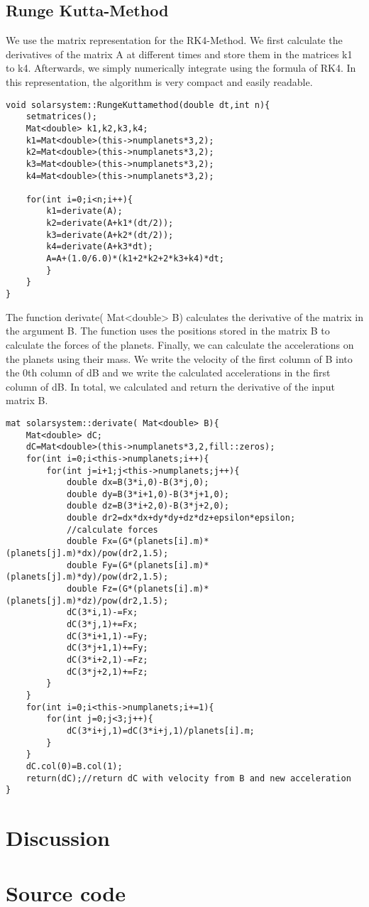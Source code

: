 \documentclass[10pt,a4paper]{article}
\begin{document}
\subsection{Runge Kutta-Method}
We use the matrix representation for the RK4-Method. We first calculate the derivatives of the matrix A at different times and store them in the matrices k1 to k4. Afterwards, we simply numerically integrate using the formula of RK4. In this representation, the algorithm is very compact and easily readable. 
\begin{lstlisting}
void solarsystem::RungeKuttamethod(double dt,int n){
    setmatrices();
    Mat<double> k1,k2,k3,k4;
    k1=Mat<double>(this->numplanets*3,2);
    k2=Mat<double>(this->numplanets*3,2);
    k3=Mat<double>(this->numplanets*3,2);
    k4=Mat<double>(this->numplanets*3,2);

    for(int i=0;i<n;i++){
        k1=derivate(A);
        k2=derivate(A+k1*(dt/2));
        k3=derivate(A+k2*(dt/2));
        k4=derivate(A+k3*dt);
        A=A+(1.0/6.0)*(k1+2*k2+2*k3+k4)*dt;
        }
    }
}
\end{lstlisting}
The function derivate( Mat<double> B) calculates the derivative of the matrix in the argument B. The function uses the positions stored in the matrix B to calculate the forces of the planets. Finally, we can calculate the accelerations on the planets using their mass. We write the velocity of the first column of B into the 0th column of dB and we write the calculated accelerations in the first column of dB. 
In total, we calculated and return the derivative of the input matrix B.
\begin{lstlisting}
mat solarsystem::derivate( Mat<double> B){
    Mat<double> dC;
    dC=Mat<double>(this->numplanets*3,2,fill::zeros);
    for(int i=0;i<this->numplanets;i++){
        for(int j=i+1;j<this->numplanets;j++){
            double dx=B(3*i,0)-B(3*j,0);
            double dy=B(3*i+1,0)-B(3*j+1,0);
            double dz=B(3*i+2,0)-B(3*j+2,0);
            double dr2=dx*dx+dy*dy+dz*dz+epsilon*epsilon;
            //calculate forces
            double Fx=(G*(planets[i].m)*(planets[j].m)*dx)/pow(dr2,1.5);
            double Fy=(G*(planets[i].m)*(planets[j].m)*dy)/pow(dr2,1.5);
            double Fz=(G*(planets[i].m)*(planets[j].m)*dz)/pow(dr2,1.5);
            dC(3*i,1)-=Fx;
            dC(3*j,1)+=Fx;
            dC(3*i+1,1)-=Fy;
            dC(3*j+1,1)+=Fy;
            dC(3*i+2,1)-=Fz;
            dC(3*j+2,1)+=Fz;
        }
    }
    for(int i=0;i<this->numplanets;i+=1){
        for(int j=0;j<3;j++){
            dC(3*i+j,1)=dC(3*i+j,1)/planets[i].m;
        }
    }
    dC.col(0)=B.col(1);
    return(dC);//return dC with velocity from B and new acceleration
}
\end{lstlisting}
\section{Discussion}

\section{Source code}

\begin{thebibliography}{mustermarke}
\end{thebibliography}
\end{document}
